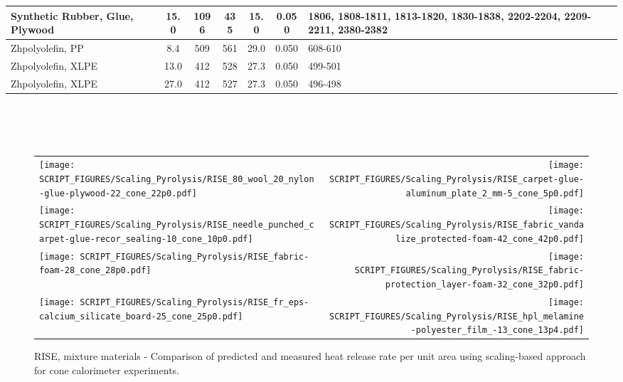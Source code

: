 \begin{table}[!ht]
\begin{tabular}{|l|c|c|c|c|c|p{3.7cm}|}
Synthetic Rubber, Glue, Plywood                   & 15.0 & 1096 & 435 & 15.0 & 0.050 & 1806, 1808-1811, 1813-1820, 1830-1838, 2202-2204, 2209-2211, 2380-2382 \\\hline
Zhpolyolefin, PP                                  & 8.4 & 509 & 561 & 29.0 & 0.050 & 608-610 \\\hline
Zhpolyolefin, XLPE                                & 13.0 & 412 & 528 & 27.3 & 0.050 & 499-501 \\\hline
Zhpolyolefin, XLPE                                & 27.0 & 412 & 527 & 27.3 & 0.050 & 496-498 \\\hline
\end{tabular}
\label{Properties_RISE_Materials_Mixtures2}
\end{table}
\vspace{-0.4cm}
\\
\\
\\



\begin{figure}[p]
\begin{tabular*}{\textwidth}{l@{\extracolsep{\fill}}r}
\texttt{[image: SCRIPT\_FIGURES/Scaling\_Pyrolysis/RISE\_80\_wool\_20\_nylon-glue-plywood-22\_cone\_22p0.pdf]} &
\texttt{[image: SCRIPT\_FIGURES/Scaling\_Pyrolysis/RISE\_carpet-glue-aluminum\_plate\_2\_mm-5\_cone\_5p0.pdf]} \\
\texttt{[image: SCRIPT\_FIGURES/Scaling\_Pyrolysis/RISE\_needle\_punched\_carpet-glue-recor\_sealing-10\_cone\_10p0.pdf]} &
\texttt{[image: SCRIPT\_FIGURES/Scaling\_Pyrolysis/RISE\_fabric\_vandalize\_protected-foam-42\_cone\_42p0.pdf]} \\
\texttt{[image: SCRIPT\_FIGURES/Scaling\_Pyrolysis/RISE\_fabric-foam-28\_cone\_28p0.pdf]} &
\texttt{[image: SCRIPT\_FIGURES/Scaling\_Pyrolysis/RISE\_fabric-protection\_layer-foam-32\_cone\_32p0.pdf]} \\
\texttt{[image: SCRIPT\_FIGURES/Scaling\_Pyrolysis/RISE\_fr\_eps-calcium\_silicate\_board-25\_cone\_25p0.pdf]} &
\texttt{[image: SCRIPT\_FIGURES/Scaling\_Pyrolysis/RISE\_hpl\_melamine-polyester\_film\_-13\_cone\_13p4.pdf]} \\
\end{tabular*}
\caption[HRRPUA of RISE Materials using scaling model, mixtures materials]
{RISE, mixture materials - Comparison of predicted and measured heat release rate per unit area using scaling-based approach for cone calorimeter experiments.}
\label{RISE_Materials_HRR_Mixtures1}
\end{figure}


